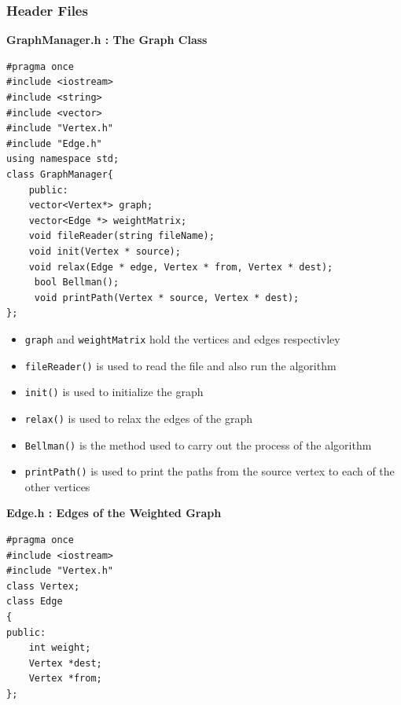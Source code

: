 \documentclass[letterpaper, 10pt]{article}
\begin{document}
\subsubsection{Header Files}

\textbf{GraphManager.h : The Graph Class}
 \begin{addmargin}[-5em]{1em}
\begin{small}
\begin{verbatim}
#pragma once
#include <iostream>
#include <string>
#include <vector>
#include "Vertex.h"
#include "Edge.h"
using namespace std;
class GraphManager{
    public:
    vector<Vertex*> graph;
    vector<Edge *> weightMatrix;
    void fileReader(string fileName);
    void init(Vertex * source);
    void relax(Edge * edge, Vertex * from, Vertex * dest);
     bool Bellman();
     void printPath(Vertex * source, Vertex * dest);
};

\end{verbatim}
\end{small}
\end{addmargin}   

\begin{itemize}
    \item \texttt{graph} and \texttt{weightMatrix} hold the vertices and edges respectivley
    \item \texttt{fileReader()} is used to read the file and also run the algorithm
    \item \texttt{init()} is used to initialize the graph
    \item \texttt{relax()} is used to  relax the edges of the graph
    \item \texttt{Bellman()} is the method used to carry out the process of the algorithm
    \item \texttt{printPath()} is used to print the paths from the source vertex to each of the other vertices
\end{itemize}


\textbf{Edge.h : Edges of the Weighted Graph}
 \begin{addmargin}[-5em]{1em}
\begin{small}
\begin{verbatim}
#pragma once
#include <iostream>
#include "Vertex.h"
class Vertex;
class Edge
{
public:
    int weight;
    Vertex *dest;
    Vertex *from;
};

\end{verbatim}
\end{small}
\end{addmargin}   
\end{document}
